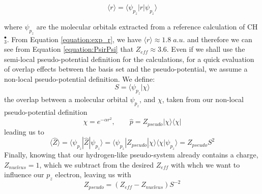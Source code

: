 \documentclass[aip]{revtex4-1}
\begin{document}
\begin{equation}
\langle r \rangle = \langle \psi_{p_{z}} | r | \psi_{p_{z}} \rangle
\label{equation:exp_r}
\end{equation}


 where \(\psi_{p_{z}}\) are the molecular orbitals extracted from a reference calculation of CH\(^{\bullet}_{3}\). From Equation \ref{equation:exp_r}, we have \( \langle r \rangle \approx 1.8\;a.u.\) and therefore we can see from Equation \ref{equation:PsirPsi} that \(Z_{eff} \approx 3.6\). Even if we shall use the semi-local pseudo-potential definition for the calculations, for a quick evaluation of overlap effects between the basis set and the pseudo-potential, we assume a non-local pseudo-potential definition. We define:
\begin{equation}
S = \langle \psi_{p_{z}} | \chi \rangle
\end{equation}
the overlap between a molecular orbital \(\psi_{p_{z}}\), and \(\chi\), taken from our non-local pseudo-potential definition \cite{huzinaga_effective_1991}
\begin{equation}
\chi = e^{-\alpha r^{2}},\qquad \widehat{p} = Z_{pseudo} | \chi \rangle \langle \chi |
\end{equation}
leading us to
\begin{equation}
\langle \widehat{Z} \rangle = \langle \psi_{p_{z}} | \widehat{Z} | \psi_{p_{z}} \rangle = \langle \psi_{p_{z}} | Z_{pseudo} | \chi \rangle \langle \chi | \psi_{p_{z}} \rangle = Z_{pseudo} S^{2}
\end{equation}
Finally, knowing that our hydrogen-like pseudo-system already contains a charge, \(Z_{nucleus}=1\), which we subtract from the desired \(Z_{eff}\) with whch we want to influence our \(p_{z}\) electron, leaving us with
\begin{equation}
Z_{pseudo} = (Z_{eff} - Z_{nucleus})S^{-2}
\end{equation}
\end{document}
